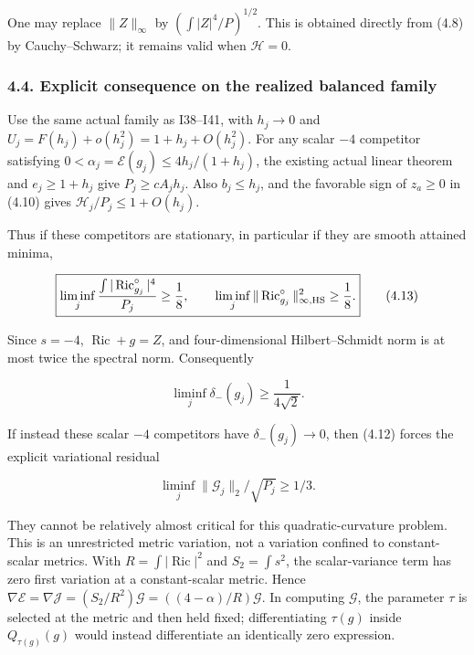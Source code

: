 \documentclass[
  10pt,
]{article}
\begin{document}
One may replace \(\|Z\|_\infty\) by \((\int|Z|^4/P)^{1/2}\). This is
obtained directly from (4.8) by Cauchy--Schwarz; it remains valid when
\(\mathcal H=0\).

\hypertarget{explicit-consequence-on-the-realized-balanced-family}{%
\subsubsection{4.4. Explicit consequence on the realized balanced
family}\label{explicit-consequence-on-the-realized-balanced-family}}

Use the same actual family as I38--I41, with \(h_j\to0\) and
\(U_j=F(h_j)+o(h_j^2)=1+h_j+O(h_j^2)\). For any scalar \(-4\) competitor
satisfying \(0<\alpha_j=\mathcal E(g_j)\le4h_j/(1+h_j)\), the existing
actual linear theorem and \(e_j\ge1+h_j\) give \(P_j\ge cA_jh_j\). Also
\(b_j\le h_j\), and the favorable sign of \(z_a\ge0\) in (4.10) gives
\(\mathcal H_j/P_j\le1+O(h_j)\).

Thus if these competitors are stationary, in particular if they are
smooth attained minima,

\[
 \boxed{
 \liminf_j\frac{\int|\operatorname{Ric}^{\circ}_{g_j}|^4}{P_j}\ge\frac18,
 \qquad
 \liminf_j\|\operatorname{Ric}^{\circ}_{g_j}\|_{\infty,\rm HS}^2\ge\frac18.}
                                                        \tag{4.13}
\]

Since \(s=-4\), \(\operatorname{Ric}+g=Z\), and four-dimensional
Hilbert--Schmidt norm is at most twice the spectral norm. Consequently

\[
                         \liminf_j\delta_-(g_j)\ge\frac1{4\sqrt2}.
                                                        \tag{4.14}
\]

If instead these scalar \(-4\) competitors have \(\delta_-(g_j)\to0\),
then (4.12) forces the explicit variational residual

\[
                   \boxed{\liminf_j
                       \|\mathcal G_j\|_2/\sqrt{P_j}\ge1/3.}   \tag{4.15}
\]

They cannot be relatively almost critical for this quadratic-curvature
problem. This is an unrestricted metric variation, not a variation
confined to constant-scalar metrics. With
\(R=\int|\operatorname{Ric}|^2\) and \(S_2=\int s^2\), the
scalar-variance term has zero first variation at a constant-scalar
metric. Hence
\(\nabla\mathcal E=\nabla\mathcal J=(S_2/R^2)\mathcal G =((4-\alpha)/R)\mathcal G\).
In computing \(\mathcal G\), the parameter \(\tau\) is selected at the
metric and then held fixed; differentiating \(\tau(g)\) inside
\(Q_{\tau(g)}(g)\) would instead differentiate an identically zero
expression.
\end{document}
